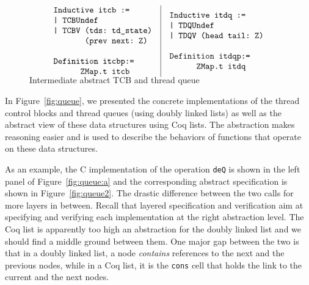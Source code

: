 {{
\setlength{\floatsep}{-10pt}
\setlength{\belowcaptionskip}{-5pt}
\begin{figure}[ht]\scriptsize
$$
\begin{array}{l|l}
\begin{array}{l}
\verb+Inductive itcb :=+\\
\verb+| TCBUndef+\\
\verb+| TCBV (tds: td_state)+\\
\verb+       (prev next: Z)+\\
\\
\verb+Definition itcbp:=+\\
\verb+      ZMap.t itcb+
\end{array}
&
\begin{array}{l}
\verb+Inductive itdq :=+\\
\verb+| TDQUndef+\\
\verb+| TDQV (head tail: Z)+\\
\\
\verb+Definition itdqp:=+\\
\verb+      ZMap.t itdq+
\end{array}
\vspace*{-14pt}
\end{array}
$$ 
\caption{Intermediate abstract TCB and thread queue}
\label{fig:abs:ltdq}
\end{figure}
}}

In Figure~\ref{fig:queue}, we
presented the concrete implementations of the thread control blocks
and thread queues (using doubly linked lists) as well as the abstract
view of these data structures using Coq lists.  The abstraction 
makes reasoning easier and is used to describe the behaviors of
functions that operate on these data structures.

As an example, the C implementation of the operation \verb"deQ" is shown
in the left panel of Figure~\ref{fig:queue:a} and the corresponding
abstract specification is shown in Figure~\ref{fig:queue2}.
The drastic difference between the two calls for more
layers in between.  Recall that layered specification and verification
aim at specifying and verifying each implementation at the right
abstraction level.  The Coq list is apparently too high an abstraction
for the doubly linked list and we should find a middle ground between
them.  One major gap between the two is that in a doubly linked list,
a node {\em contains} references to the next and the previous nodes,
while in a Coq list, it is the \verb"cons" cell that holds the link to
the current and the next nodes.

